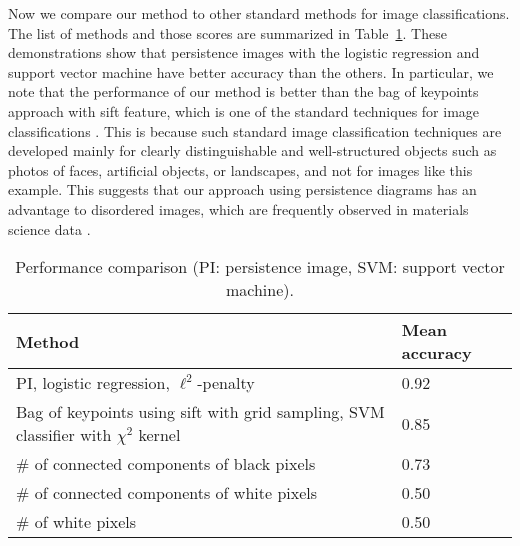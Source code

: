 \documentclass[smallextended]{svjour3}
\begin{document}
Now we compare our method to other standard methods for image classifications. The list of methods and those scores are summarized in Table~\ref{tab:logreg_results}. These demonstrations show that persistence images with the logistic regression and support vector machine have better accuracy than the others. In particular, we note that the performance of our method is better than the bag of keypoints approach with sift feature, which is one of the standard techniques for image classifications \citep{sift,bow,bow-classification,bow-strategy}.
This is because such standard image classification techniques are developed mainly for clearly distinguishable and well-structured objects such as photos of faces, artificial objects, or landscapes, and not for images like this example. This suggests that our approach using persistence diagrams has an advantage to disordered images, which are frequently observed in materials science data \citep{iron}.


\begin{table}[htbp]
  \centering
  \begin{tabular}{|p{8cm}|l|} \hline
    Method & Mean accuracy \\ \hline\hline
    PI, logistic regression, $\ell^2$-penalty & 0.92 \\ \hline
    Bag of keypoints using sift with grid sampling,
    SVM classifier with $\chi^2$ kernel & 0.85 \\ \hline
    \# of connected components of black pixels & 0.73 \\ \hline
    \# of connected components of white pixels & 0.50 \\ \hline
    \# of white pixels & 0.50 \\ \hline
  \end{tabular}
  \caption{Performance comparison (PI: persistence image, SVM: support vector machine). %
  }
  \label{tab:logreg_results}
\end{table}
\end{document}
